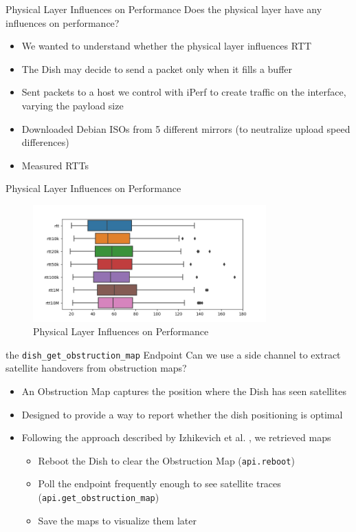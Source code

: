 \documentclass[NET,english,beameralt]{tumbeamer}
\begin{document}
\begin{frame}{Physical Layer Influences on Performance}
    Does the physical layer have any influences on performance? 
    \begin{itemize}
        \item We wanted to understand whether the physical layer influences RTT
        \item The Dish may decide to send a packet only when it fills a buffer
        \item Sent packets to a host we control with iPerf to create traffic on the interface, varying the payload size
        \item Downloaded Debian ISOs from 5 different mirrors (to neutralize upload speed differences)
        \item Measured RTTs 
    \end{itemize}
\end{frame}

\begin{frame}{{Physical Layer Influences on Performance}}
    \begin{figure}
        \includegraphics[width=0.8\textwidth]{pics/rtt-iperf-stress.png}
        \caption{Physical Layer Influences on Performance}
    \end{figure}
\end{frame}

\begin{frame}{the \texttt{dish\_get\_obstruction\_map} Endpoint}
    Can we use a side channel to extract satellite handovers from obstruction maps?
    \begin{itemize}
        \item An Obstruction Map captures the position where the Dish has seen satellites
        \item Designed to provide a way to report whether the dish positioning is optimal
        \item Following the approach described by Izhikevich et al. \cite{izhikevich2023democratizing}, we retrieved maps
        \begin{itemize}
            \item Reboot the Dish to clear the Obstruction Map (\texttt{api.reboot})
            \item Poll the endpoint frequently enough to see satellite traces (\texttt{api.get\_obstruction\_map})
            \item Save the maps to visualize them later
        \end{itemize}
    \end{itemize}
\end{frame}
\end{document}
